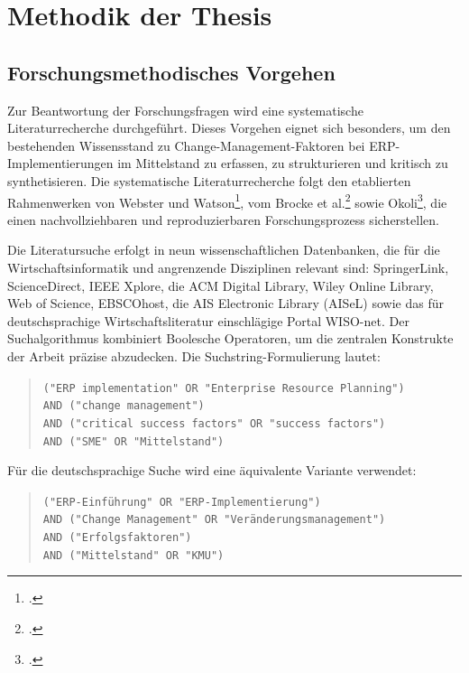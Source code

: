 \section{Methodik der Thesis}

\subsection{Forschungsmethodisches Vorgehen}

Zur Beantwortung der Forschungsfragen wird eine systematische Literaturrecherche durchgeführt. Dieses Vorgehen eignet sich besonders, um den bestehenden Wissensstand zu Change-Management-Faktoren bei ERP-Implementierungen im Mittelstand zu erfassen, zu strukturieren und kritisch zu synthetisieren. Die systematische Literaturrecherche folgt den etablierten Rahmenwerken von Webster und Watson\footcite[Vgl.][S.~xv--xviii]{webster2002}, vom Brocke et al.\footcite[Vgl.][S.~218--220]{vombrocke2015} sowie Okoli\footcite[Vgl.][S.~882]{okoli2015}, die einen nachvollziehbaren und reproduzierbaren Forschungsprozess sicherstellen.

Die Literatursuche erfolgt in neun wissenschaftlichen Datenbanken, die für die Wirtschaftsinformatik und angrenzende Disziplinen relevant sind: SpringerLink, ScienceDirect, IEEE Xplore, die ACM Digital Library, Wiley Online Library, Web of Science, EBSCOhost, die AIS Electronic Library (AISeL) sowie das für deutschsprachige Wirtschaftsliteratur einschlägige Portal WISO-net. Der Suchalgorithmus kombiniert Boolesche Operatoren, um die zentralen Konstrukte der Arbeit präzise abzudecken. Die Suchstring-Formulierung lautet:

\begin{quote}
\verb|("ERP implementation" OR "Enterprise Resource Planning")|\\
\verb|AND ("change management")|\\
\verb|AND ("critical success factors" OR "success factors")|\\
\verb|AND ("SME" OR "Mittelstand")|
\end{quote}

Für die deutschsprachige Suche wird eine äquivalente Variante verwendet:

\begin{quote}
\verb|("ERP-Einführung" OR "ERP-Implementierung")|\\
\verb|AND ("Change Management" OR "Veränderungsmanagement")|\\
\verb|AND ("Erfolgsfaktoren")|\\
\verb|AND ("Mittelstand" OR "KMU")|
\end{quote}


